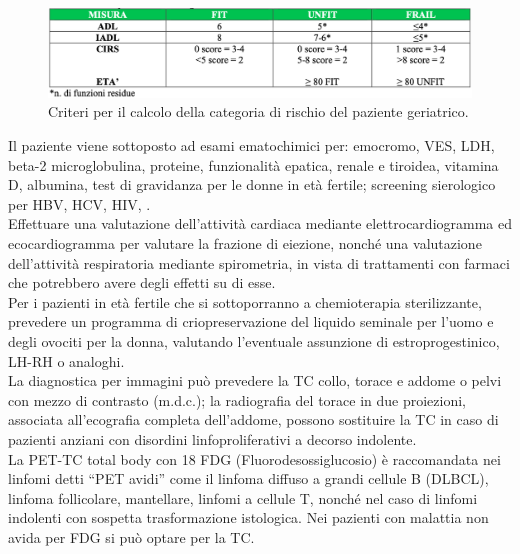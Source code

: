 \begin{figure}[H]
    \begin{center}
    \includegraphics[width=0.7\columnwidth]{img/FIT-UNFIT-FRAIL.png}
    \vspace{-3mm}
    \end{center}
    \caption{Criteri per il calcolo della categoria di rischio del paziente geriatrico.
    \cite{AIOM}}
    \label{fig:FIGURE_2.12}
\end{figure}

Il paziente viene sottoposto ad esami ematochimici per: emocromo, VES, LDH, beta-2 microglobulina, proteine, 
funzionalità epatica, renale e tiroidea, vitamina D, albumina, test di gravidanza per le donne in età fertile; 
screening sierologico per HBV, HCV, HIV\cite{AIOM}, \cite{reteveneta}.\\
Effettuare una valutazione dell’attività cardiaca mediante elettrocardiogramma ed ecocardiogramma per valutare 
la frazione di eiezione, nonché una valutazione dell’attività respiratoria mediante spirometria, in vista di 
trattamenti con farmaci che potrebbero avere degli effetti su di esse\cite{AIOM}.\\ 
Per i pazienti in età fertile che si sottoporranno a chemioterapia sterilizzante, prevedere un programma di 
criopreservazione del liquido seminale per l’uomo e degli ovociti per la donna, valutando l’eventuale assunzione di 
estroprogestinico, LH-RH o analoghi\cite{AIOM}.\\

La diagnostica per immagini può prevedere la TC collo, torace e addome o pelvi con mezzo di contrasto (m.d.c.); 
la radiografia del torace in due proiezioni, associata all’ecografia completa dell’addome, possono sostituire 
la TC in caso di pazienti anziani con disordini linfoproliferativi a decorso indolente.\\
La PET-TC total body con 18 FDG (Fluorodesossiglucosio) è raccomandata nei linfomi detti “PET avidi” come il linfoma diffuso 
a grandi cellule B (DLBCL), linfoma follicolare, mantellare, linfomi a cellule T, nonché nel caso di linfomi indolenti 
con sospetta trasformazione istologica. Nei pazienti con malattia non avida per FDG si può optare per la TC\cite{reteveneta}.\\ 

